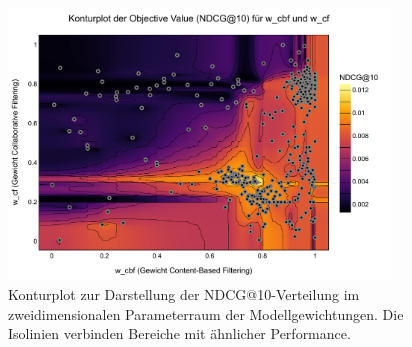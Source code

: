 
\begin{figure}[H]
    \centering
    \includegraphics[width=0.9\textwidth]{content/figures/svg/kontourplot.pdf}
    \caption{Konturplot zur Darstellung der NDCG@10-Verteilung im zweidimensionalen Parameterraum der Modellgewichtungen. Die Isolinien verbinden Bereiche mit ähnlicher Performance.}
    \label{fig:kontourplot}
\end{figure}